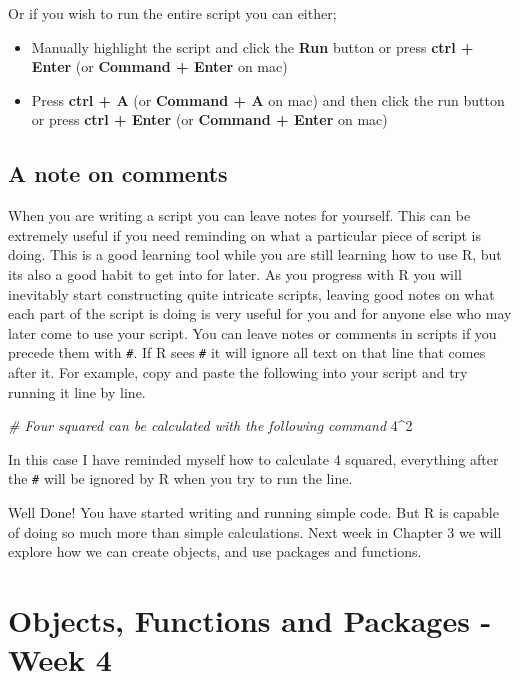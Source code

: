 \documentclass[
]{book}
\newenvironment{Shaded}{\begin{snugshade}}{\end{snugshade}}
\newcommand{\CommentTok}[1]{\textcolor[rgb]{0.56,0.35,0.01}{\textit{#1}}}
\newcommand{\DecValTok}[1]{\textcolor[rgb]{0.00,0.00,0.81}{#1}}
\newcommand{\SpecialCharTok}[1]{\textcolor[rgb]{0.81,0.36,0.00}{\textbf{#1}}}
\providecommand{\tightlist}{%
  \setlength{\itemsep}{0pt}\setlength{\parskip}{0pt}}
\begin{document}
Or if you wish to run the entire script you can either;

\begin{itemize}
\tightlist
\item
  Manually highlight the script and click the \textbf{Run} button or press \textbf{ctrl + Enter} (or \textbf{Command + Enter} on mac)
\item
  Press \textbf{ctrl + A} (or \textbf{Command + A} on mac) and then click the run button or press \textbf{ctrl + Enter} (or \textbf{Command + Enter} on mac)
\end{itemize}

\section{A note on comments}\label{a-note-on-comments}

When you are writing a script you can leave notes for yourself. This can be extremely useful if you need reminding on what a particular piece of script is doing. This is a good learning tool while you are still learning how to use R, but its also a good habit to get into for later. As you progress with R you will inevitably start constructing quite intricate scripts, leaving good notes on what each part of the script is doing is very useful for you and for anyone else who may later come to use your script. You can leave notes or comments in scripts if you precede them with \texttt{\#}. If R sees \texttt{\#} it will ignore all text on that line that comes after it. For example, copy and paste the following into your script and try running it line by line.

\begin{Shaded}
\begin{Highlighting}[]
\CommentTok{\# Four squared can be calculated with the following command}
\DecValTok{4}\SpecialCharTok{\^{}}\DecValTok{2}
\end{Highlighting}
\end{Shaded}

In this case I have reminded myself how to calculate 4 squared, everything after the \texttt{\#} will be ignored by R when you try to run the line.

Well Done! You have started writing and running simple code. But R is capable of doing so much more than simple calculations. Next week in Chapter 3 we will explore how we can create objects, and use packages and functions.

\chapter{Objects, Functions and Packages - Week 4}\label{objects-functions-and-packages---week-4}
\end{document}
